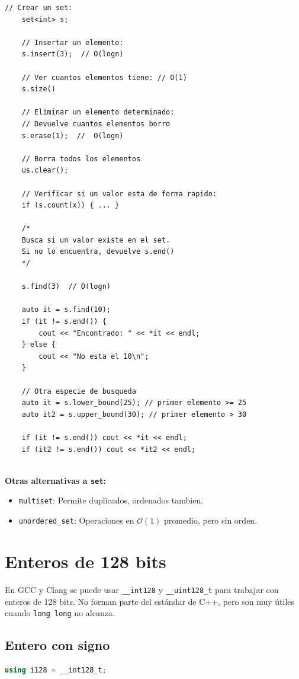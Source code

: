\begin{lstlisting}[style=cppstyle, caption={Funcionamiento del stack}]
	// Crear un set:
	set<int> s;
	
	// Insertar un elemento:
	s.insert(3);  // O(logn)
	
	// Ver cuantos elementos tiene: // O(1)
	s.size()
	
	// Eliminar un elemento determinado: 
	// Devuelve cuantos elementos borro
	s.erase(1);  //  O(logn)
	
	// Borra todos los elementos
	us.clear();
	
	// Verificar si un valor esta de forma rapido: 
	if (s.count(x)) { ... }
	
	/* 
	Busca si un valor existe en el set.
	Si no lo encuentra, devuelve s.end()
	*/
	
	s.find(3)  // O(logn)
	
	auto it = s.find(10);
	if (it != s.end()) {
		cout << "Encontrado: " << *it << endl;
	} else {
		cout << "No esta el 10\n";
	}
	
	// Otra especie de busqueda
	auto it = s.lower_bound(25); // primer elemento >= 25
	auto it2 = s.upper_bound(30); // primer elemento > 30
	
	if (it != s.end()) cout << *it << endl;
	if (it2 != s.end()) cout << *it2 << endl;
	
\end{lstlisting}

\textbf{Otras alternativas a \texttt{set}:}
\begin{itemize}
	\item \texttt{multiset}: Permite duplicados, ordenados tambien.
	\item \texttt{unordered\_set}: Operaciones en $\mathcal{O}(1)$ promedio, pero sin orden.
\end{itemize}

\section{Enteros de 128 bits}
En GCC y Clang se puede usar \texttt{\_\_int128} y \texttt{\_\_uint128\_t} para trabajar con enteros de 128 bits. No forman parte del estándar de C++, pero son muy útiles cuando \texttt{long long} no alcanza.

\subsection{Entero con signo}
\begin{lstlisting}[language=C++, caption={Entero de 128 bits con signo}]
using i128 = __int128_t;
\end{lstlisting}

